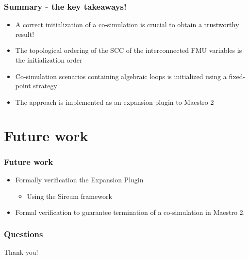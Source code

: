 \documentclass{beamer}
\begin{document}
\begin{frame}
\frametitle{Summary - the key takeaways!}
\begin{itemize}
    \item A correct initialization of a co-simulation is crucial to obtain a trustworthy result!
    \item The topological ordering of the SCC of the interconnected FMU variables is the initialization order
    \item Co-simulation scenarios containing algebraic loops is initialized using a fixed-point strategy
    \item The approach is implemented as an expansion plugin to Maestro 2  
\end{itemize}
\end{frame}

\section{Future work}

\begin{frame}
\frametitle{Future work}
\begin{itemize}
    \item Formally verification the Expansion Plugin  
    \begin{itemize}
        \item Using the Sireum framework
    \end{itemize}
    \item Formal verification to guarantee termination of a co-simulation in Maestro 2.
\end{itemize}
\end{frame}

\begin{frame}
\frametitle{Questions}
\huge
Thank you!
\end{frame}
\end{document}
